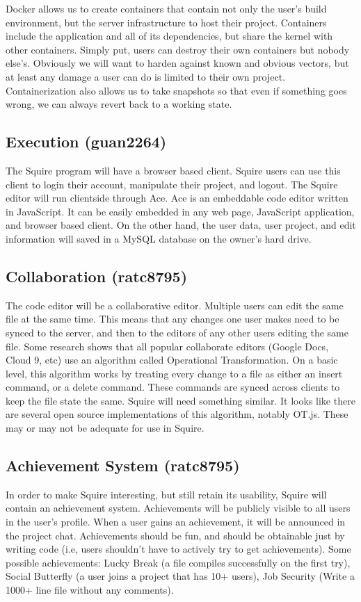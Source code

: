 \documentclass[11pt]{report}
\begin{document}
Docker allows us to create containers that contain not only the user's build environment, but the server infrastructure to host their project. Containers include the application and all of its dependencies, but share the kernel with other containers. Simply put, users can destroy their own containers but nobody else’s. Obviously we will want to harden against known and obvious vectors, but at least any damage a user can do is limited to their own project. Containerization also allows us to take snapshots so that even if something goes wrong, we can always revert back to a working state.

\subsection{Execution (guan2264)}
The Squire program will have a browser based client. Squire users can use this client to login their account, manipulate their project, and logout. The Squire editor will run clientside through Ace. Ace is an embeddable code editor written in JavaScript. It can be easily embedded in any web page, JavaScript application, and browser based client. On the other hand, the user data, user project, and edit information will saved in a MySQL database on the owner's hard drive.  

\subsection{Collaboration (ratc8795)}
The code editor will be a collaborative editor. Multiple users can edit the same file at the same time. This means that any changes one user makes need to be synced to the server, and then to the editors of any other users editing the same file. Some research shows that all popular collaborate editors (Google Docs, Cloud 9, etc) use an algorithm called Operational Transformation. On a basic level, this algorithm works by treating every change to a file as either an insert command, or a delete command. These commands are synced across clients to keep the file state the same. Squire will need something similar. It looks like there are several open source implementations of this algorithm, notably OT.js. These may or may not be adequate for use in Squire.
 
\subsection{Achievement System (ratc8795)}
In order to make Squire interesting, but still retain its usability, Squire will contain an achievement system. Achievements will be publicly visible to all users in the user's profile. When a user gains an achievement, it will be announced in the project chat. Achievements should be fun, and should be obtainable just by writing code (i.e, users shouldn’t have to actively try to get achievements). Some possible achievements: Lucky Break (a file compiles successfully on the first try), Social Butterfly (a user joins a project that has 10+ users), Job Security (Write a 1000+ line file without any comments).
\end{document}
